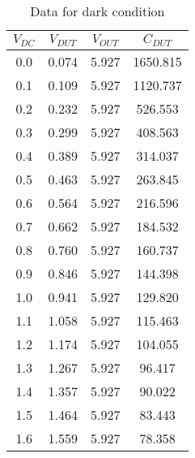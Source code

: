 \begin{table}[H]
    \centering
    \begin{tabular}{|c|c|c|c|}
        \hline
        $V_{DC}$ & $V_{DUT}$ & $V_{OUT}$ & $C_{DUT}$   \\ \hline
        0.0      & 0.074     & 5.927 & 1650.815 \\
        0.1      & 0.109     & 5.927 & 1120.737 \\
        0.2      & 0.232     & 5.927 &  526.553 \\
        0.3      & 0.299     & 5.927 &  408.563 \\
        0.4      & 0.389     & 5.927 &  314.037 \\
        0.5      & 0.463     & 5.927 &  263.845 \\
        0.6      & 0.564     & 5.927 &  216.596 \\
        0.7      & 0.662     & 5.927 &  184.532 \\
        0.8      & 0.760     & 5.927 &  160.737 \\
        0.9      & 0.846     & 5.927 &  144.398 \\
        1.0      & 0.941     & 5.927 &  129.820 \\
        1.1      & 1.058     & 5.927 &  115.463 \\
        1.2      & 1.174     & 5.927 &  104.055 \\
        1.3      & 1.267     & 5.927 &   96.417 \\
        1.4      & 1.357     & 5.927 &   90.022 \\
        1.5      & 1.464     & 5.927 &   83.443 \\
        1.6      & 1.559     & 5.927 &   78.358 \\ \hline
    \end{tabular}
    \caption{Data for dark condition}
    \label{tab:1}
\end{table}